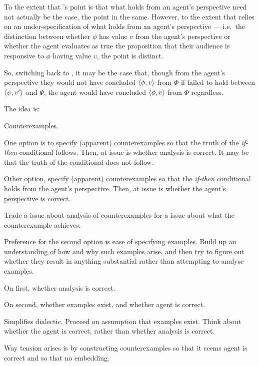 \begin{note}
{  To the extent that \citeauthor{Harman:1973ww}'s point is that what holds from an agent's perspective need not actually be the case, the point in the same.
  However, to the extent that \citeauthor{Harman:1973ww} relies on an under-specification of what holds from an agent's perspective --- i.e.\ the distinction between whether \(\phi\) has value \(v\) from the agent's perspective or whether the agent evaluates as true the proposition that their audience is responsive to \(\phi\) having value \(v\), the point is distinct.
  }

  So, switching back to \qWhyV{}, it may be the case that, though from the agent's perspective they would not have concluded \(\langle \phi, v \rangle\) from \(\Phi\) if \support{} failed to hold between \(\langle \psi, v' \rangle\) and \(\Psi\), the agent would have concluded \(\langle \phi, v \rangle\) from \(\Phi\) regardless.
\end{note}

\begin{note}
  The idea is:

  Counterexamples.

  One option is to specify (apparent) counterexamples so that the truth of the \emph{if-then} conditional follows.
  Then, at issue is whether analysis is correct.
  It may be that the truth of the conditional does not follow.

  Other option, specify (apparent) counterexamples so that the \emph{if-then} conditional holds from the agent's perspective.
  Then, at issue is whether the agent's perspective is correct.

  Trade a issue about analysis of counterexamples for a issue about what the counterexample achieves.

  Preference for the second option is ease of specifying examples.
  Build up an understanding of how and why such examples arise, and then try to figure out whether they result in anything substantial rather than attempting to analyse examples.

  On first, whether analysis is correct.

  On second, whether examples exist, and whether agent is correct.

  Simplifies dialectic.
  Proceed on assumption that examples exist.
  Think about whether the agent is correct, rather than whether analysis is correct.

  Way tension arises is by constructing counterexamples so that it seems agent is correct and so that no embedding.
\end{note}

